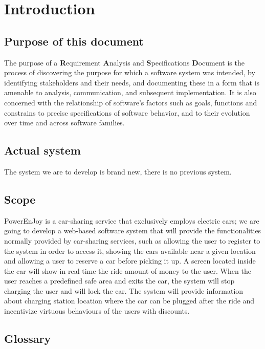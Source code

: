 \section{Introduction}
\subsection{Purpose of this document}
The purpose of a \textbf{R}equirement \textbf{A}nalysis and \textbf{S}pecifications \textbf{D}ocument is the process of discovering the purpose for which a software system was intended, by identifying stakeholders and their needs, and documenting these in a form that is amenable to analysis, communication, and subsequent implementation.  It is also concerned with the relationship of software's factors such as goals, functions and constrains to precise specifications of software behavior, and to their evolution over time and across software families.

\subsection{Actual system}
The system we are to develop is brand new, there is no previous system.

\subsection{Scope}
PowerEnJoy is a car-sharing service that exclusively employs electric cars; we are going to develop a web-based software system that will provide the functionalities normally provided by car-sharing services, such as allowing the user to register to the system in order to access it, showing the cars available near a given location and allowing a user to reserve a car before picking it up.
A screen located inside the car will show in real time the ride amount of money to the user. When the user reaches a predefined safe area and exits the car, the system will stop charging the user and will lock the car. The system will provide information about charging station location where the car can be plugged after the ride and incentivize virtuous behaviours of the users with discounts.

\subsection{Glossary}
